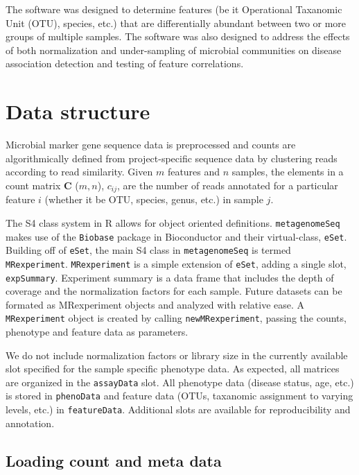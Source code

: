 \documentclass[a4paper,12pt]{article}
\begin{document}
The software was designed to determine features (be it Operational Taxanomic Unit (OTU), species, etc.) that are differentially abundant between two or more groups of multiple samples. 
The software was also designed to address the effects of both normalization and under-sampling of microbial communities on disease association detection and testing of feature correlations.

\section{Data structure}

Microbial marker gene sequence data is preprocessed and counts are algorithmically defined from project-specific sequence data by clustering reads according to read similarity. 
Given $m$ features and $n$ samples, the elements in a count matrix \textbf{C} ($m, n$), $c_{ij}$, are the number of reads annotated for a particular feature $i$ (whether it be OTU, species, genus, etc.) in sample $j$.

The S4 class system in R allows for object oriented definitions. \texttt{metagenomeSeq} makes use of the \texttt{Biobase} package in Bioconductor and their virtual-class, \texttt{eSet}. Building off of \texttt{eSet}, the main S4 class in \texttt{metagenomeSeq} is termed \texttt{MRexperiment}. \texttt{MRexperiment} is a simple extension of \texttt{eSet}, adding a single slot, \texttt{expSummary}. Experiment summary is a data frame that includes the depth of coverage and the normalization factors for each sample. Future datasets can be formated as MRexperiment objects and analyzed with relative ease. A \texttt{MRexperiment} object is created by calling \texttt{newMRexperiment}, passing the counts, phenotype and feature data as parameters.

We do not include normalization factors or library size in the currently available slot specified for the sample specific phenotype data. As expected, all matrices are organized in the \texttt{assayData} slot. All phenotype data (disease status, age, etc.) is stored in \texttt{phenoData} and feature data (OTUs, taxanomic assignment to varying levels, etc.) in \texttt{featureData}. Additional slots are available for reproducibility and annotation.

\subsection{Loading count and meta data}
\end{document}

